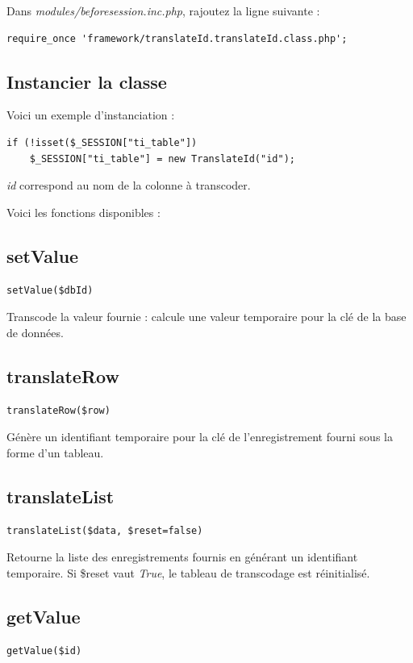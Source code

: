 Dans \textit{modules/beforesession.inc.php}, rajoutez la ligne suivante :
\begin{lstlisting}
require_once 'framework/translateId.translateId.class.php';
\end{lstlisting}

\subsection{Instancier la classe}
Voici un exemple d'instanciation :
\begin{lstlisting}
if (!isset($_SESSION["ti_table"]) 
	$_SESSION["ti_table"] = new TranslateId("id");
\end{lstlisting}

\textit{id} correspond au nom de la colonne à transcoder.

Voici les fonctions disponibles :

\subsection{setValue}
\begin{lstlisting}
setValue($dbId)
\end{lstlisting}
Transcode la valeur fournie : calcule une valeur temporaire pour la clé de la base de données.

\subsection{translateRow}
\begin{lstlisting}
translateRow($row)
\end{lstlisting}

Génère un identifiant temporaire pour la clé de l'enregistrement fourni sous la forme d'un tableau.

\subsection{translateList}
\begin{lstlisting}
translateList($data, $reset=false)
\end{lstlisting}
Retourne la liste des enregistrements fournis en générant un identifiant temporaire. Si \$reset vaut \textit{True}, le tableau de transcodage est réinitialisé.

\subsection{getValue}
\begin{lstlisting}
getValue($id)
\end{lstlisting}

